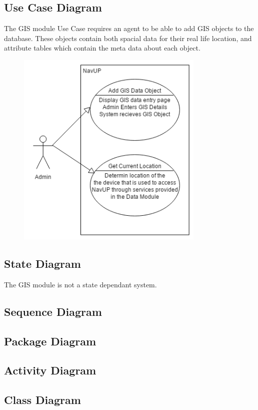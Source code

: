 \subsection{Use Case Diagram}

The GIS module Use Case requires an agent to be able to add GIS objects to the database. These objects contain both spacial data for their real life location, and attribute tables which contain the meta data about each object. \\

\begin{figure} 
  \includegraphics[width=0.8\textwidth]{GIS/GIS_Use_case.png}
\end{figure}

\subsection{State Diagram}
The GIS module is not a state dependant system.

\subsection{Sequence Diagram}

\subsection{Package Diagram}

\subsection{Activity Diagram}

\subsection{Class Diagram}
